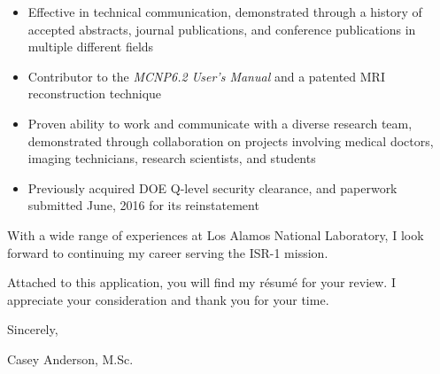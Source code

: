 \begin{center}
\begin{minipage}{0.95\textwidth}
\begin{itemize}[leftmargin=.25in,rightmargin=.5in,itemsep=1.0mm]
	\item Effective in technical communication, demonstrated through a history of accepted abstracts, journal publications, and conference publications in multiple different fields
	\item Contributor to the \textit{MCNP6.2 User's Manual} and a patented MRI reconstruction technique
	
	\item Proven ability to work and communicate with a diverse research team, demonstrated through collaboration on projects involving medical doctors, imaging technicians, research scientists, and students
		
	\item Previously acquired DOE Q-level security clearance, and paperwork submitted June, 2016 for its reinstatement
  \end{itemize} 

  \vspace{3mm}
  With a wide range of experiences at Los Alamos National Laboratory, I look forward to continuing my career serving the ISR-1 mission.
  
  \vspace{2mm}
  
  Attached to this application, you will find my r\'{e}sum\'{e} for your review. I appreciate your consideration and thank you for your time.
  
  \vspace{6mm}
  
  Sincerely, \\ \vspace{-4mm}
  
  
  Casey Anderson, M.Sc.
  
  \end{minipage}
  \end{center}

